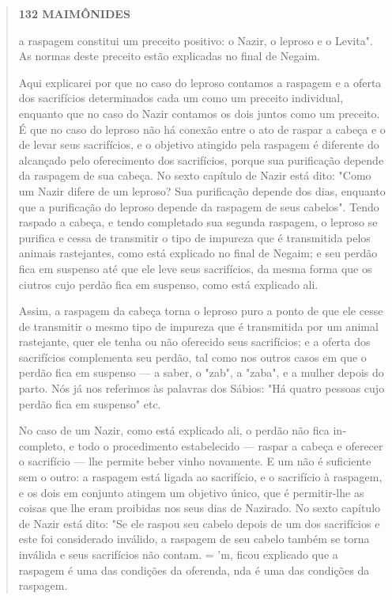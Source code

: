 \begin{quote}
\textbf{132 MAIMÔNIDES}

a raspagem constitui um preceito positivo: o Nazir, o leproso e o
Levita". As normas deste preceito estão explicadas no final de Negaim.

Aqui explicarei por que no caso do leproso contamos a raspagem e a
oferta dos sacrifícios determinados cada um como um preceito individual,
enquanto que no caso do Nazir contamos os dois juntos como um preceito.
É que no caso do leproso não há conexão entre o ato de raspar a cabeça e
o de levar seus sacrifícios, e o objetivo atingido pela raspagem é
diferente do al­cançado pelo oferecimento dos sacrifícios, porque sua
purificação depende da raspagem de sua cabeça. No sexto capítulo de
Nazir está dito: "Como um Nazir difere de um leproso? Sua purificação
depende dos dias, enquanto que a purifi­cação do leproso depende da
raspagem de seus cabelos". Tendo raspado a ca­beça, e tendo completado
sua segunda raspagem, o leproso se purifica e cessa de transmitir o tipo
de impureza que é transmitida pelos animais rastejantes, como está
explicado no final de Negaim; e seu perdão fica em suspenso até que ele
leve seus sacrifícios, da mesma forma que os ciutros cujo perdão fica em
suspenso, como está explicado ali.

Assim, a raspagem da cabeça torna o leproso puro a ponto de que ele
cesse de transmitir o mesmo tipo de impureza que é transmitida por um
animal rastejante, quer ele tenha ou não oferecido seus sacrifícios; e a
oferta dos sacrifícios complementa seu perdão, tal como nos outros casos
em que o perdão fica em suspenso --- a saber, o "zab", a "zaba", e a
mulher depois do parto. Nós já nos referimos às palavras dos Sábios: "Há
quatro pessoas cujo per­dão fica em suspenso" etc.

No caso de um Nazir, como está explicado ali, o perdão não fica
in­completo, e todo o procedimento estabelecido --- raspar a cabeça e
oferecer o sacrifício --- lhe permite beber vinho novamente. E um não é
suficiente sem o outro: a raspagem está ligada ao sacrifício, e o
sacrifício à raspagem, e os dois em conjunto atingem um objetivo único,
que é permitir-lhe as coisas que lhe eram proibidas nos seus dias de
Nazirado. No sexto capítulo de Nazir está dito: "Se ele raspou seu
cabelo depois de um dos sacrifícios e este foi considerado inválido, a
raspagem de seu cabelo também se torna inválida e seus sacrifícios não
contam. = 'm, ficou explicado que a raspagem é uma das condições da
oferenda, nda é uma das condições da raspagem.
\end{quote}


